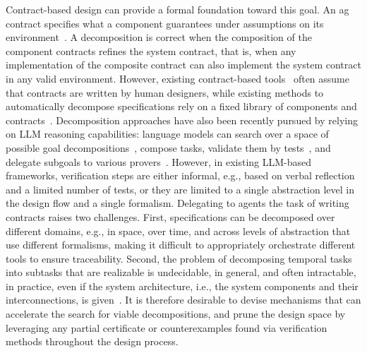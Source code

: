 Contract-based design can provide a formal foundation toward this goal. An \gls{ag} contract specifies what a component guarantees under assumptions on its environment~\cite{benveniste2018contracts}. A decomposition is correct when the composition of the component contracts refines the system contract, that is, when any implementation of the composite contract can also implement the system contract in any valid environment. 
However, existing contract-based tools~\cite{nuzzo2018chase,cimatti2013ocra} often 
assume that contracts are written by human designers, while existing methods to automatically decompose specifications rely on a fixed library of components and contracts~\cite{iannopollo2018decomposition}. Decomposition approaches have also been recently pursued by relying on LLM reasoning capabilities: language models can search over a space of possible goal decompositions~\cite{yao2023tot}, compose tasks, validate them by tests~\cite{zelikman2023parsel}, and delegate subgoals to various provers~\cite{jiang2022thor,jiang2023dsp,ren2025deepseekprover}. However, in existing LLM-based frameworks, verification steps are either informal, e.g., based on verbal reflection~\cite{shinn2023reflexion} and a limited number of tests, or they are limited to a single abstraction level in the design flow and a single formalism. 
Delegating to agents the task of writing contracts raises two challenges. First, specifications can be decomposed over different domains, e.g., in space, over time, and across levels of abstraction that use different formalisms, making it difficult to appropriately orchestrate different tools to ensure traceability. 
Second, the problem of decomposing temporal tasks into subtasks that are realizable is undecidable, in general, and often intractable, in practice, even if the system architecture, i.e., the system components and their interconnections, is given~\cite{pnueli1990distributed}. It is therefore desirable to devise mechanisms that can accelerate the search for viable decompositions, and prune the design space by leveraging any partial certificate or counterexamples found via verification methods throughout the design process. 

